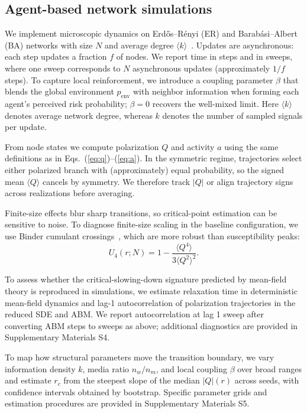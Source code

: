 \documentclass[12pt]{article}
\begin{document}
\subsection{Agent-based network simulations}
We implement microscopic dynamics on Erd\H{o}s--R\'enyi (ER) and Barab\'asi--Albert (BA) networks with size $N$ and average degree $\langle k\rangle$~\cite{Erdos1959,Barabasi1999,PastorSatorras2015}. Updates are asynchronous: each step updates a fraction $f$ of nodes. We report time in steps and in sweeps, where one sweep corresponds to $N$ asynchronous updates (approximately $1/f$ steps). To capture local reinforcement, we introduce a coupling parameter $\beta$ that blends the global environment $p_{\text{env}}$ with neighbor information when forming each agent's perceived risk probability; $\beta=0$ recovers the well-mixed limit. Here $\langle k\rangle$ denotes average network degree, whereas $k$ denotes the number of sampled signals per update.

From node states we compute polarization $Q$ and activity $a$ using the same definitions as in Eqs.~(\ref{eq:q})--(\ref{eq:a}). In the symmetric regime, trajectories select either polarized branch with (approximately) equal probability, so the signed mean $\langle Q\rangle$ cancels by symmetry. We therefore track $|Q|$ or align trajectory signs across realizations before averaging.

Finite-size effects blur sharp transitions, so critical-point estimation can be sensitive to noise. To diagnose finite-size scaling in the baseline configuration, we use Binder cumulant crossings~\cite{Binder1981,NewmanBarkema1999}, which are more robust than susceptibility peaks:
\begin{equation}
U_4(r;N)=1-\frac{\langle Q^4\rangle}{3\langle Q^2\rangle^2}.
\label{eq:binder}
\end{equation}

To assess whether the critical-slowing-down signature predicted by mean-field theory is reproduced in simulations, we estimate relaxation time in deterministic mean-field dynamics and lag-1 autocorrelation of polarization trajectories in the reduced SDE and ABM. We report autocorrelation at lag 1 sweep after converting ABM steps to sweeps as above; additional diagnostics are provided in Supplementary Materials S4.

To map how structural parameters move the transition boundary, we vary information density $k$, media ratio $n_w/n_m$, and local coupling $\beta$ over broad ranges and estimate $r_c$ from the steepest slope of the median $|Q|(r)$ across seeds, with confidence intervals obtained by bootstrap. Specific parameter grids and estimation procedures are provided in Supplementary Materials S5.
\end{document}
